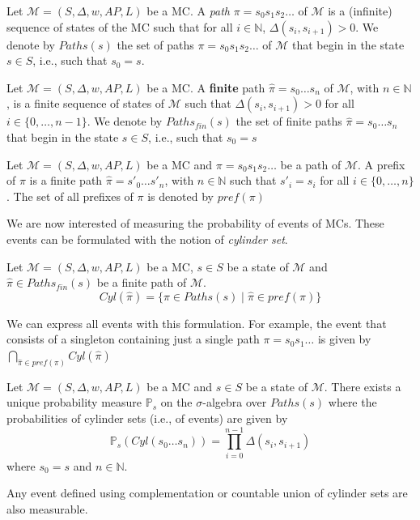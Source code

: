 \begin{definition} Let $\mathcal{M} = (S, \Delta, w, AP, L)$ be a MC.
A \textit{path} $\pi = s_0 s_1 s_2 \dots$ of $\mathcal{M}$ is a (infinite) sequence of states of the MC such that for all $i \in \mathbb{N}$, $\Delta(s_i, s_{i+1})> 0$. We denote by $Paths(s)$ the set of paths $\pi = s_0s_1s_2\dots$ of $\mathcal{M}$ that begin in the state $s \in S$, i.e., such that $s_0 = s$.
\end{definition}
\begin{definition}
Let $\mathcal{M} = (S, \Delta, w, AP, L)$ be a MC.
A \textbf{finite} path $\hat{\pi} = s_0 \dots s_n$ of $\mathcal{M}$, with $n \in \mathbb{N}$, is a finite sequence of states of $\mathcal{M}$ such that $\Delta(s_i, s_{i+1}) > 0$ for all $i \in \{0, \dots, n-1\}$.
We denote by $Paths_{fin}(s)$ the set of finite paths $\hat{\pi} = s_0 \dots s_n$ that begin in the state $s \in S$, i.e., such that $s_0 = s$
\end{definition}
\begin{definition}
Let $\mathcal{M} = (S, \Delta, w, AP, L)$ be a MC and $\pi = s_0s_1s_2 \dots$ be a path of $\mathcal{M}$. A prefix of $\pi$ is a finite path $\hat{\pi} = s'_0 \dots s'_n$, with $n \in \mathbb{N}$ such that $s'_i = s_i$ for all $i \in \{0, \dots, n\}$. The set of all prefixes of $\pi$ is denoted by $pref(\pi)$
\end{definition}

We are now interested of measuring the probability of events of MCs. These events can be formulated with the notion of \textit{cylinder set}.

\begin{definition}
Let $\mathcal{M} = (S, \Delta, w, AP, L)$ be a MC, $s \in S$ be a state of $\mathcal{M}$ and $\hat{\pi} \in Paths_{fin}(s)$ be a finite path of $\mathcal{M}$.
\[Cyl(\hat{\pi})=\{\pi\in Paths(s)\;|\;\hat{\pi}\in pref(\pi) \} \]
\end{definition}

We can express all events with this formulation. For example, the event that consists of a singleton containing just a single path $\pi = s_0s_1\dots$ is given by $\bigcap_{\hat{\pi} \in pref(\pi)} Cyl(\hat{\pi})$

\begin{theorem}\label{theo1}
  Let $\mathcal{M}=(S, \Delta, w, AP, L)$ be a MC and $s \in S$ be a state of $\mathcal{M}$. There exists a unique probability measure $\mathbb{P}_s$ on the
  $\sigma$-algebra over $Paths(s)$ where the probabilities of cylinder sets (i.e., of events) are given by
  \[
    \mathbb{P}_s(Cyl(s_0 \dots s_n)) = \prod_{i = 0}^{n - 1} \Delta(s_i, s_{i+1})
  \]
  where $s_0 = s$ and $n \in \mathbb{N}$.
\end{theorem}
\begin{corollary}
Any event defined using complementation or countable union of cylinder sets are also measurable.
\end{corollary}

